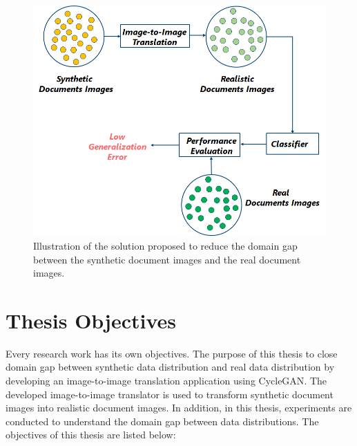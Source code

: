 \begin{figure}[H]
        \begin{center}
	    \includegraphics[scale=0.55]{images/Introduction/ProposedSolution.png}
	    \caption[Illustration of the solution proposed to reduce the domain gap between the synthetic document images and the real document images.]{Illustration of the solution proposed to reduce the domain gap between the synthetic document images and the real document images.}
	    \label{fig:ProposedSolution}
	    \end{center}
\end{figure}

\newpage

\section{Thesis Objectives}\label{thesisobjectives}
Every research work has its own objectives. The purpose of this thesis to close domain gap between synthetic data distribution and real data distribution by developing an image-to-image translation application using \ac{CycleGAN}. The developed image-to-image translator is used to transform synthetic document images into realistic document images. In addition, in this thesis, experiments are conducted to understand the domain gap between data distributions. The objectives of this thesis are listed below:

